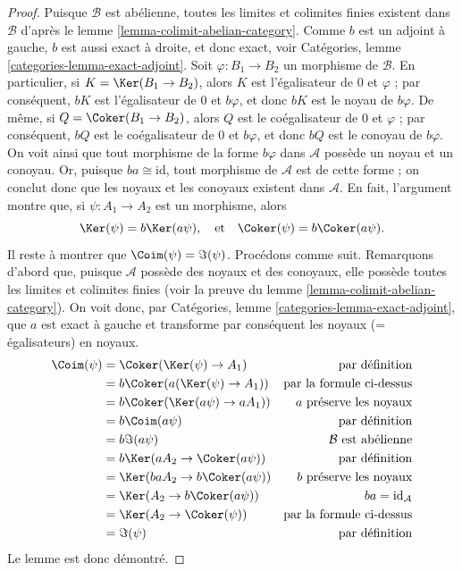 \begin{proof}
Puisque $\mathcal{B}$ est abélienne, toutes les limites et colimites finies
existent dans $\mathcal{B}$ d'après le lemme \ref{lemma-colimit-abelian-category}.
Comme $b$ est un adjoint à gauche, $b$ est aussi exact à droite,
et donc exact, voir
Catégories, lemme \ref{categories-lemma-exact-adjoint}.
Soit $\varphi : B_1 \to B_2$ un morphisme de $\mathcal{B}$.
En particulier, si $K = \Ker(B_1 \to B_2)$, alors $K$ est
l'égalisateur de $0$ et $\varphi$ ; par conséquent,
$bK$ est l'égalisateur de $0$ et $b\varphi$, et donc
$bK$ est le noyau de $b\varphi$. De même, si
$Q = \Coker(B_1 \to B_2)$, alors $Q$ est
le coégalisateur de $0$ et $\varphi$ ; par conséquent,
$bQ$ est le coégalisateur de $0$ et $b\varphi$, et donc
$bQ$ est le conoyau de $b\varphi$. On voit ainsi que tout morphisme
de la forme $b\varphi$ dans $\mathcal{A}$ possède un noyau et un conoyau.
Or, puisque $ba \cong \text{id}$, tout morphisme de
$\mathcal{A}$ est de cette forme ; on conclut donc que les noyaux et
les conoyaux existent dans $\mathcal{A}$. En fait, l'argument montre que,
si $\psi : A_1 \to A_2$ est un morphisme, alors
$$
\Ker(\psi) = b\Ker(a\psi),
\quad\text{et}\quad
\Coker(\psi) = b\Coker(a\psi).
$$
Il reste à montrer que $\Coim(\psi)= \Im(\psi)$.
Procédons comme suit.
Remarquons d'abord que, puisque $\mathcal{A}$ possède des noyaux et des conoyaux, elle
possède toutes les limites et colimites finies (voir la preuve du
lemme \ref{lemma-colimit-abelian-category}).
On voit donc, par Catégories, lemme \ref{categories-lemma-exact-adjoint},
que $a$ est exact à gauche et
transforme par conséquent les noyaux (= égalisateurs) en noyaux.
\begin{align*}
\Coim(\psi)
& =
\Coker(\Ker(\psi) \to A_1)
& \text{par définition} \\
& =
b\Coker(a(\Ker(\psi) \to A_1))
& \text{par la formule ci-dessus} \\
& =
b\Coker(\Ker(a\psi) \to aA_1))
& a\text{ préserve les noyaux} \\
& =
b\Coim(a\psi)
& \text{par définition} \\
& =
b\Im(a\psi)
& \mathcal{B}\text{ est abélienne} \\
& =
b\Ker(aA_2 \to \Coker(a\psi))
& \text{par définition} \\
& =
\Ker(baA_2 \to b\Coker(a\psi))
& b\text{ préserve les noyaux} \\
& =
\Ker(A_2 \to b\Coker(a\psi))
& ba = \text{id}_\mathcal{A} \\
& =
\Ker(A_2 \to \Coker(\psi))
& \text{par la formule ci-dessus} \\
& =
\Im(\psi)
& \text{par définition}
\end{align*}
Le lemme est donc démontré.
\end{proof}





